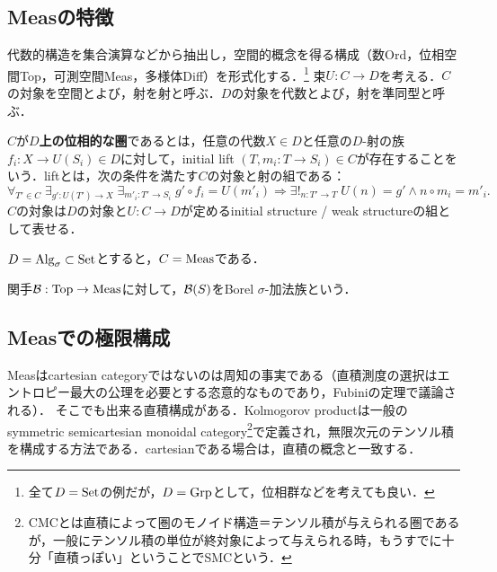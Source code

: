 \documentclass[uplatex,dvipdfmx]{jsreport}
\begin{document}
\subsection{Measの特徴}

\begin{definition}
    代数的構造を集合演算などから抽出し，空間的概念を得る構成（数Ord，位相空間Top，可測空間Meas，多様体Diff）を形式化する．\footnote{全て$D=\mathrm{Set}$の例だが，$D=\mathrm{Grp}$として，位相群などを考えても良い．}
    束$U:C\to D$を考える．$C$の対象を空間とよび，射を射と呼ぶ．$D$の対象を代数とよび，射を準同型と呼ぶ．

    $C$が\textbf{$D$上の位相的な圏}であるとは，任意の代数$X\in D$と任意の$D$-射の族$f_i:X\to U(S_i)\in D$に対して，initial lift $(T,m_i:T\to S_i)\in C$が存在することをいう．liftとは，次の条件を満たす$C$の対象と射の組である：
    \[\forall_{T'\in C}\;\exists_{g':U(T')\to X}\;\exists_{m'_i:T'\to S_i}\;g'\circ f_i=U(m'_i)\Rightarrow\exists!_{n:T'\to T}\;U(n)=g'\land n\circ m_i=m'_i.\]
    $C$の対象は$D$の対象と$U:C\to D$が定めるinitial structure / weak structureの組として表せる．
\end{definition}

\begin{example}[Meas]
    $D=\mathrm{Alg}_\sigma\subset\mathrm{Set}$とすると，$C=\mathrm{Meas}$である．
\end{example}

\begin{definition}[Borel可測空間]
    関手$\mathcal{B}:\mathrm{Top}\to\mathrm{Meas}$に対して，$\mathcal{B}(S)$をBorel $\sigma$-加法族という．
\end{definition}

\subsection{Measでの極限構成}

\begin{tcolorbox}[colframe=ForestGreen, colback=ForestGreen!10!white,breakable,colbacktitle=ForestGreen!40!white,coltitle=black,fonttitle=\bfseries\sffamily,
title=]
    Measはcartesian categoryではないのは周知の事実である（直積測度の選択はエントロピー最大の公理を必要とする恣意的なものであり，Fubiniの定理で議論される）．
    そこでも出来る直積構成がある．Kolmogorov productは一般のsymmetric semicartesian monoidal category\footnote{CMCとは直積によって圏のモノイド構造＝テンソル積が与えられる圏であるが，一般にテンソル積の単位が終対象によって与えられる時，もうすでに十分「直積っぽい」ということでSMCという．}で定義され，無限次元のテンソル積を構成する方法である．cartesianである場合は，直積の概念と一致する．
\end{tcolorbox}
\end{document}
